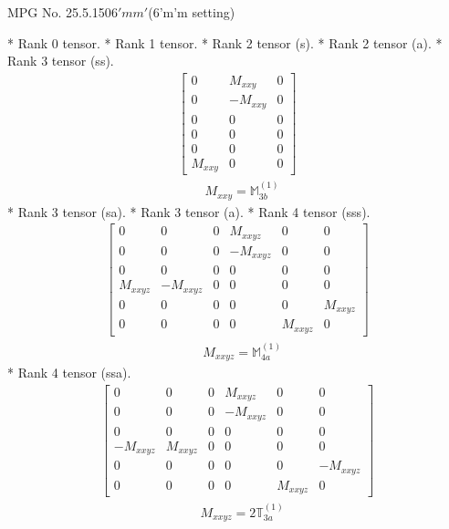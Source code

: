 \documentclass[fleqn,8pt,landscape]{jsarticle}
\begin{document}
\setcounter{MaxMatrixCols}{32}

\renewcommand{\tablename}{Table~}
\renewcommand{\figurename}{Figure~}
\begin{center}
\LARGE
MPG No. 25.5.150\quad$6'mm'$\quad(6'm'm setting)
\end{center}
* Rank 0 tensor.
* Rank 1 tensor.
* Rank 2 tensor (s).
* Rank 2 tensor (a).
* Rank 3 tensor (ss).
\begin{align*}
\begin{bmatrix} 0 & M_{xxy} & 0 \\ 0 & - M_{xxy} & 0 \\ 0 & 0 & 0 \\ 0 & 0 & 0 \\ 0 & 0 & 0 \\ M_{xxy} & 0 & 0 \end{bmatrix}
\end{align*}
\begin{align*}
& M_{xxy} = \mathbb{M}_{3b}^{(1)}
\end{align*}
* Rank 3 tensor (sa).
* Rank 3 tensor (a).
* Rank 4 tensor (sss).
\begin{align*}
\begin{bmatrix} 0 & 0 & 0 & M_{xxyz} & 0 & 0 \\ 0 & 0 & 0 & - M_{xxyz} & 0 & 0 \\ 0 & 0 & 0 & 0 & 0 & 0 \\ M_{xxyz} & - M_{xxyz} & 0 & 0 & 0 & 0 \\ 0 & 0 & 0 & 0 & 0 & M_{xxyz} \\ 0 & 0 & 0 & 0 & M_{xxyz} & 0 \end{bmatrix}
\end{align*}
\begin{align*}
& M_{xxyz} = \mathbb{M}_{4a}^{(1)}
\end{align*}
* Rank 4 tensor (ssa).
\begin{align*}
\begin{bmatrix} 0 & 0 & 0 & M_{xxyz} & 0 & 0 \\ 0 & 0 & 0 & - M_{xxyz} & 0 & 0 \\ 0 & 0 & 0 & 0 & 0 & 0 \\ - M_{xxyz} & M_{xxyz} & 0 & 0 & 0 & 0 \\ 0 & 0 & 0 & 0 & 0 & - M_{xxyz} \\ 0 & 0 & 0 & 0 & M_{xxyz} & 0 \end{bmatrix}
\end{align*}
\begin{align*}
& M_{xxyz} = 2 \mathbb{T}_{3a}^{(1)}
\end{align*}
\end{document}
